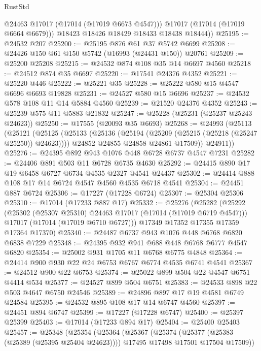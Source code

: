 \begin{lexlean}{RustStd}
\begin{coremodule}
            @24463
            @17017
            (@17014 (@17019 @6673 @4547)))
          @17017
          (@17014 (@17019 @6664 @6679)))
        @18423
        @18426
        @18429
        @18433
        @18438
        @18444))
@25195 := @24532 @207
@25200 := @25195 @876 @61 @37 @5742 @6699
@25208 := @24426 @150 @61 @150 @5742 (@16993 (@24431 @150)) @20761
@25209 := @25200 @25208
@25215 := @24532 @874 @108 @35 @14 @6697 @4560
@25218 := @24512 @874 @35 @6697
@25220 := @17541 @24376 @4352
@25221 := @25220 @446
@25222 := @25221 @35
@25228 := @25222 @580 @15 @4547 @6696 @6693 @19828
@25231 := @24527 @580 @15 @6696
@25237 := @24532 @578 @108 @11 @14 @5884 @4560
@25239 := @21520 @24376 @4352
@25243 := @25239 @575 @11 @5883 @21832
@25247 := @25228 (@25231 (@25237 @25243 @24623))
@25250 := @17555 (@20093 @35 @6693)
@25268 := @24993
    (@25113
      (@25121
        (@25125
          (@25133
            (@25136 (@25194 (@25209 (@25215 (@25218 (@25247 @25250)) @24623))))
            @24852
            @24855
            @24858
            @24861
            @17509))
        @24911))
@25276 := @24395 @892 @943 @1076 @448 @6728 @6737 @4547 @7231
@25282 := @24406 @891 @503 @11 @6728 @6735 @4630
@25292 := @24415 @890 @17 @19 @6458 @6727 @6734 @4535 @2327 @4541 @24437
@25302 := @24414 @888 @108 @17 @14 @6724 @4547 @4560 @4535 @6718 @4541
@25304 := @24451 @887 @6724
@25306 := @17227 (@17228 @6724)
@25307 := @25304 @25306
@25310 := @17014 (@17233 @887 @17)
@25332 := @25276
    (@25282
      (@25292
        (@25302 (@25307 @25310) @24463 @17017 (@17014 (@17019 @6719 @4547)))
        @17017
        (@17014 (@17019 @6710 @6727)))
      @17349
      @17352
      @17355
      @17359
      @17364
      @17370)
@25340 := @24487 @6737 @943 @1076 @448 @6768 @6820 @6838 @7229
@25348 := @24395 @932 @941 @688 @448 @6768 @6777 @4547 @6820
@25354 := @25002 @931 @1705 @11 @6768 @6775 @4848
@25364 := @24414 @900 @930 @22 @24 @6753 @6767 @6774 @4535 @6741 @4541
@25367 := @24512 @900 @22 @6753
@25374 := @25022 @899 @504 @22 @4547 @6751 @4414 @534
@25377 := @24527 @899 @504 @6751
@25383 := @24533 @898 @22 @503 @4647 @6750 @24546
@25389 := @24896 @897 @17 @19 @4581 @6749 @24584
@25395 := @24532 @895 @108 @17 @14 @6747 @4560
@25397 := @24451 @894 @6747
@25399 := @17227 (@17228 @6747)
@25400 := @25397 @25399
@25403 := @17014 (@17233 @894 @17)
@25404 := @25400 @25403
@25457 := @25348
    (@25354
      (@25364
        (@25367
          (@25374
            (@25377 (@25383 (@25389 (@25395 @25404 @24623))))
            @17495
            @17498
            @17501
            @17504
            @17509))

\end{coremodule}
\end{lexlean}
